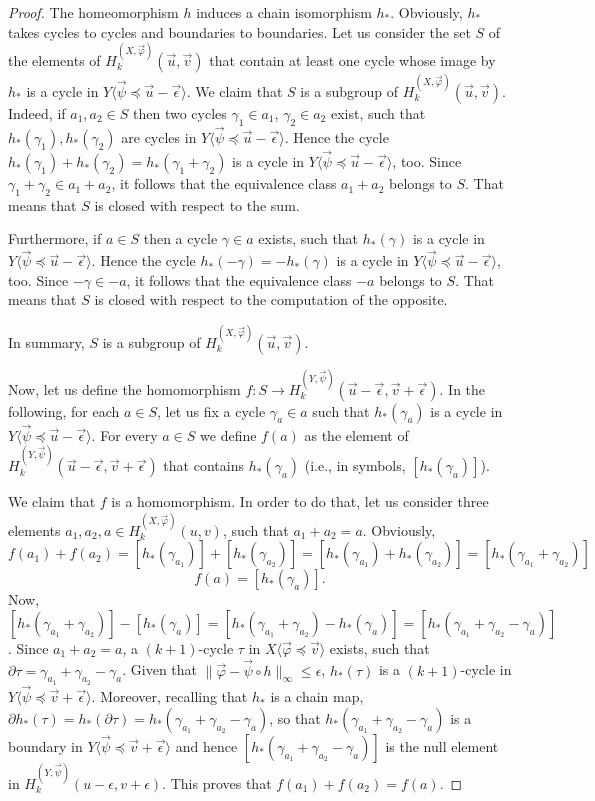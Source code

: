 \documentclass{amsart}
\theoremstyle{definition}
\theoremstyle{remark}
\numberwithin{equation}{section}
\begin{document}
\begin{proof}\label{prooflemmahom}
The homeomorphism $h$ induces a chain isomorphism $h_*$. Obviously, $h_*$ takes cycles to cycles and boundaries to boundaries.  Let us consider the set $S$ of the elements of $ H^{(X,\vec\varphi)}_k(\vec u,\vec v)$ that contain at least one cycle whose image by $h_*$ is a cycle in $Y\langle\vec\psi\preceq \vec u-\vec\epsilon\rangle$. We claim that $S$ is a subgroup of $ H^{(X,\vec\varphi)}_k(\vec u,\vec v)$. Indeed, if $a_1,a_2\in S$ then two cycles $\gamma_1\in a_1$, $\gamma_2\in a_2$ exist, such that $h_*(\gamma_1), h_*(\gamma_2)$ are cycles in $Y\langle\vec\psi\preceq \vec u-\vec\epsilon\rangle$. Hence the cycle $h_*(\gamma_1)+h_*(\gamma_2)=h_*(\gamma_1+\gamma_2)$ is a cycle in $Y\langle\vec\psi\preceq \vec u-\vec\epsilon\rangle$, too. Since $\gamma_1+\gamma_2\in a_1+a_2$, it follows that the equivalence class $a_1+a_2$ belongs to $S$. That means that $S$ is closed with respect to the sum.

Furthermore,
if $a\in S$ then a cycle $\gamma\in a$ exists, such that $h_*(\gamma)$ is a cycle in $Y\langle\vec\psi\preceq \vec u-\vec\epsilon\rangle$. Hence the cycle $h_*(-\gamma)=-h_*(\gamma)$ is a cycle in $Y\langle\vec\psi\preceq \vec u-\vec\epsilon\rangle$, too. Since $-\gamma\in -a$, it follows that the equivalence class $-a$ belongs to $S$. That means that $S$ is closed with respect to the computation of the opposite.

In summary, $S$ is a subgroup of $ H^{(X,\vec\varphi)}_k(\vec u,\vec v)$.

Now, let us define the homomorphism $f:S\to  H^{(Y,\vec\psi)}_k(\vec u-\vec \epsilon,\vec v+\vec \epsilon)$. In the following, for each $a\in S$, let us fix a cycle $\gamma_a\in a$ such that $h_*(\gamma_a)$ is a cycle in $Y\langle\vec\psi\preceq \vec u-\vec \epsilon\rangle$. For every $a\in S$ we define $f(a)$ as the element of $ H^{(Y,\vec\psi)}_k(\vec u-\vec \epsilon,\vec v+\vec \epsilon)$ that contains $h_*(\gamma_a)$ (i.e., in symbols, $[h_*(\gamma_a)]$).

We claim that $f$ is a homomorphism. In order to do that, let us consider three elements $a_1,a_2,a\in  H^{(X,\vec\varphi)}_k(u,v)$, such that $a_1+a_2=a$. Obviously,
$$f(a_1)+f(a_2)=[h_*(\gamma_{a_1})]+[h_*(\gamma_{a_2})]=[h_*(\gamma_{a_1})+h_*(\gamma_{a_2})]=[h_*(\gamma_{a_1}+\gamma_{a_2})]$$
$$f(a)=[h_*(\gamma_{a})].$$
Now, $[h_*(\gamma_{a_1}+\gamma_{a_2})]-[h_*(\gamma_{a})]=[h_*(\gamma_{a_1}+\gamma_{a_2})-h_*(\gamma_{a})]=[h_*(\gamma_{a_1}+\gamma_{a_2}-\gamma_{a})]$.
Since $a_1+a_2=a$, a $(k+1)$-cycle $\tau$ in $X\langle\vec\varphi\preceq \vec v\rangle$ exists, such that $\partial \tau=\gamma_{a_1}+\gamma_{a_2}-\gamma_a$. Given that $\|\vec\varphi-\vec\psi\circ h\|_\infty\le \epsilon$, $h_*(\tau)$ is a $(k+1)$-cycle in $Y\langle\vec\psi\preceq \vec v+\vec\epsilon\rangle$. Moreover, recalling that $h_*$ is a chain map, $\partial h_*(\tau)=h_*(\partial \tau)=h_*(\gamma_{a_1}+\gamma_{a_2}-\gamma_a)$, so that $h_*(\gamma_{a_1}+\gamma_{a_2}-\gamma_a)$ is a boundary in $Y\langle\vec\psi\preceq \vec v+\vec\epsilon\rangle$ and hence $[h_*(\gamma_{a_1}+\gamma_{a_2}-\gamma_a)]$ is the null element in $ H^{(Y,\vec\psi)}_k(u-\epsilon,v+\epsilon)$. This proves that $f(a_1)+f(a_2)=f(a)$.


\end{proof}
\end{document}
